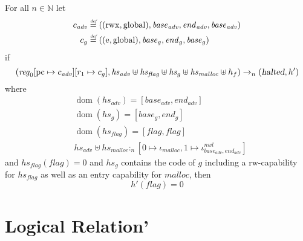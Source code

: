 \documentclass[a4paper]{article}
\newcommand{\forcenewline}{$\phantom{v}$\\}
\newcommand{\update}[2]{[#1 \mapsto #2]}
\newcommand{\defeq}{\stackrel{\textit{\tiny{def}}}{=}}
\DeclareMathOperator{\dom}{dom}
\newcommand{\var}[1]{\mathit{#1}}
\newcommand{\hs}{\var{hs}}
\newcommand{\pcreg}{\mathrm{pc}}
\newcommand{\start}{\var{base}}
\newcommand{\addrend}{\var{end}}
\newcommand{\reg}{\var{reg}}
\newcommand{\heap}{\var{heap}}
\newcommand{\adv}{\var{adv}}
\newcommand{\flag}{\var{flag}}
\newcommand{\halted}{\textsl{halted}}
\newcommand{\heapSat}[3][\heap]{#1 :_{#2} #3}
\newcommand{\codelabel}[1]{\mathit{#1}}
\newcommand{\malloc}{\codelabel{malloc}}
\newcommand{\nats}{\mathbb{N}}
\newcommand{\plainperm}[1]{\mathrm{#1}}
\newcommand{\readwrite}{\plainperm{rw}}
\newcommand{\entry}{\plainperm{e}}
\newcommand{\rwx}{\plainperm{rwx}}
\newcommand{\glob}{\plainperm{global}}
\newcommand{\step}[1][]{\rightarrow_{#1}}
\begin{document}
\begin{lemma}\forcenewline
  For all $n \in \nats$
  let
  \begin{align*}
    c_{\var{adv}} & \defeq ((\rwx,\glob),\start_{\adv},\addrend_{\adv},\start_{\adv}) \\
    c_{g} & \defeq ((\entry,\glob),\start_g,\addrend_g,\start_g)
  \end{align*}
if
  \[
    (\reg_0\update{\pcreg}{c_{\adv}}
          \update{r_1}{c_g},\hs_{\adv} \uplus \hs_{\flag} \uplus \hs_{g} \uplus \hs_{\malloc} \uplus h_f) \step[n] (\halted,h')
  \]
where 
\begin{align*}
  &\dom(hs_{\adv}) = [\start_\adv,\addrend_\adv] \\
  &\dom(hs_g) = [\start_g,\addrend_g] \\
  &\dom(hs_\flag) = [\flag,\flag] \\
  &\heapSat[\hs_{\adv} \uplus \hs_{\malloc}]{n}{[0 \mapsto \iota_{\malloc}, 1 \mapsto\iota^{\var{nwl}}_{\start_\adv,\addrend_\adv}]}
\end{align*}
and $hs_\flag(\flag) = 0$ and $hs_g$ contains the code of $g$ including a $\readwrite$-capability for $\hs_\flag$ as well as an entry capability for $\malloc$, 
then
\[
  h'(\flag) = 0
\]
\end{lemma}


\section{Logical Relation'}
\end{document}
